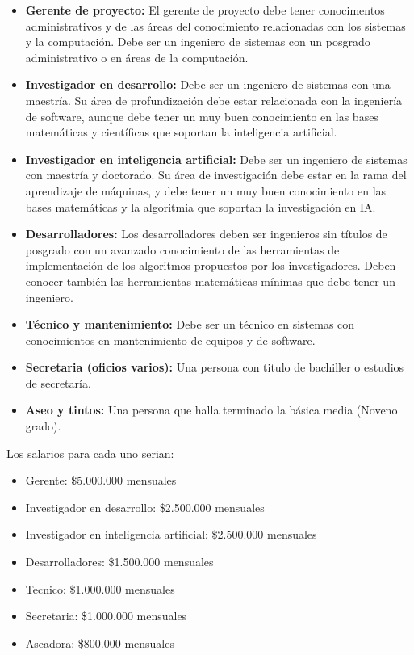 \documentclass[a4paper, 12pt, oneside]{article}
\begin{document}
	\begin{itemize}

		\item {\bf Gerente de proyecto:} El gerente de proyecto debe tener conocimentos administrativos y de las áreas del conocimiento relacionadas con los sistemas y la computación. Debe ser un ingeniero de sistemas con un posgrado administrativo o en áreas de la computación.

		\item {\bf Investigador en desarrollo:} Debe ser un ingeniero de sistemas con una maestría. Su área de profundización debe estar relacionada con la ingeniería de software, aunque debe tener un muy buen conocimiento en las bases matemáticas y científicas que soportan la inteligencia artificial.

		\item {\bf Investigador en inteligencia artificial:} Debe ser un ingeniero de sistemas con maestría y doctorado. Su área de investigación debe estar en la rama del aprendizaje de máquinas, y debe tener un muy buen conocimiento en las bases matemáticas y la algoritmia que soportan la investigación en IA.

		\item {\bf Desarrolladores:} Los desarrolladores deben ser ingenieros sin títulos de posgrado con un avanzado conocimiento de las herramientas de implementación de los algoritmos propuestos por los investigadores. Deben conocer también las herramientas matemáticas mínimas que debe tener un ingeniero.

		\item {\bf Técnico y mantenimiento:} Debe ser un técnico en sistemas con conocimientos en mantenimiento de equipos y de software.

		\item {\bf Secretaria (oficios varios):} Una persona con titulo de bachiller o estudios de secretaría.
		
		\item {\bf Aseo y tintos:} Una persona que halla terminado la básica media (Noveno grado).

	\end{itemize}	
	
	Los salarios para cada uno serian:

\begin{itemize}
	\item Gerente: \$5.000.000 mensuales
	\item Investigador en desarrollo: \$2.500.000 mensuales
	\item Investigador en inteligencia artificial: \$2.500.000 mensuales
	\item Desarrolladores: \$1.500.000 mensuales
	\item Tecnico: \$1.000.000 mensuales
	\item Secretaria: \$1.000.000 mensuales
	\item Aseadora: \$800.000 mensuales
\end{itemize}
\end{document}
